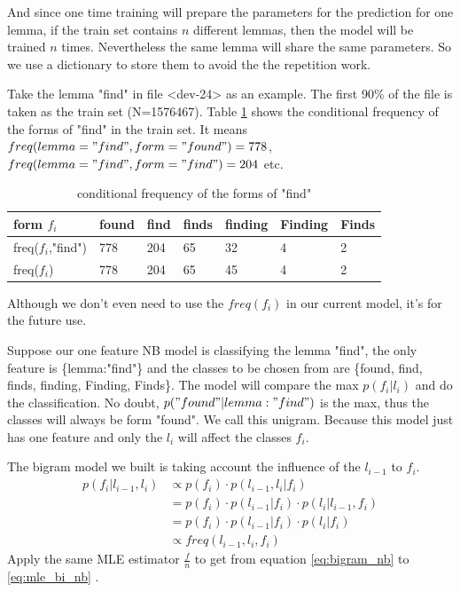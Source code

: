 \documentclass[a4paper]{article}
\begin{document}
And since one time training will prepare the parameters for the prediction for one lemma, if the train set contains $n$ different lemmas, then the model will be trained $n$ times. Nevertheless the same lemma will share the same parameters. So we use a dictionary to store them to avoid the the repetition work.



Take the lemma "find" in file <dev-24> as an example. The first 90\% of the file is taken as the train set (N=1576467). Table \ref{tb:cfd_find} shows the conditional frequency of the forms of "find" in the train set. It means $freq(lemma="find",form="found")=778$, $freq(lemma="find",form="find")=204$ etc.

\begin{table}[htb]
\centering
\begin{tabular}{|l|llllll|}
\hline
form $f_i$       & found & find & finds & finding & Finding & Finds \\ \hline
freq($f_i$,"find") & 778   & 204  & 65    & 32      & 4       & 2     \\ \hline
freq($f_i$) & 778   & 204  & 65    & 45      & 4       & 2     \\ \hline
\end{tabular}
\caption{conditional frequency of the forms of "find"}
\label{tb:cfd_find}
\end{table}


Although we don't even need to use the $freq(f_i)$ in our current model, it's for the future use.

Suppose our one feature NB model is classifying the lemma "find", the only feature is \{lemma:"find"\} and the classes to be chosen from are \{found, find, finds, finding, Finding, Finds\}. The model will compare the max $p(f_i|l_i)$ and do the classification. No doubt, $p("found" | lemma:"find")$ is the max, thus the classes will always be form "found". We call this unigram. Because this model just has one feature and only the $l_i$ will affect the classes $f_i$.

The bigram model we built is taking account the influence of the $l_{i-1}$ to $f_i$.
\begin{align}
p(f_i|l_{i-1},l_i) &\propto p(f_i) \cdot  p(l_{i-1},l_i|f_i) \label{eq:bigram_nb} \\
&= p(f_i) \cdot  p(l_{i-1}|f_i) \cdot p( l_i | l_{i-1},f_i) \\
&= p(f_i) \cdot  p(l_{i-1}|f_i) \cdot p( l_i | f_i) \\
&\propto freq(l_{i-1},l_i,f_i) \label{eq:mle_bi_nb}
\end{align}
Apply the same MLE estimator $\frac{f}{n}$ to get from equation \ref{eq:bigram_nb} to \ref{eq:mle_bi_nb} .
\end{document}
